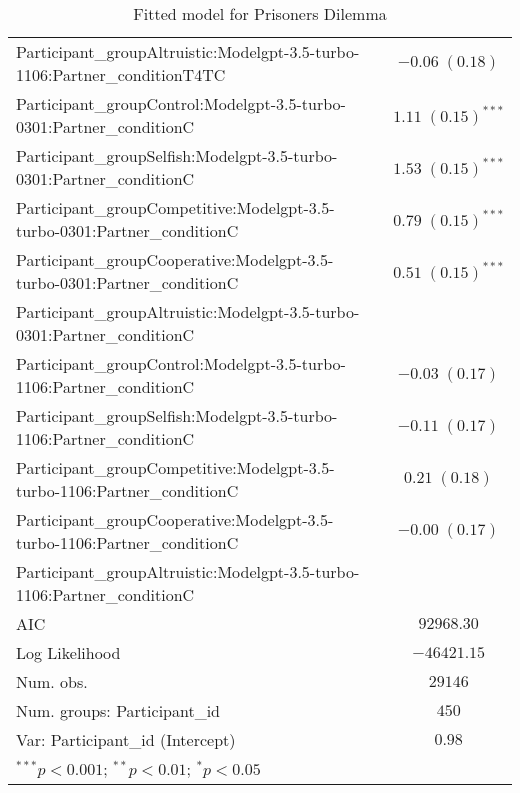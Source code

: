 \begin{table}
\begin{center}
\begin{small}
\begin{tabular}{l c}
Participant\_groupAltruistic:Modelgpt-3.5-turbo-1106:Partner\_conditionT4TC  & $-0.06 \; (0.18)$       \\
Participant\_groupControl:Modelgpt-3.5-turbo-0301:Partner\_conditionC        & $1.11 \; (0.15)^{***}$  \\
Participant\_groupSelfish:Modelgpt-3.5-turbo-0301:Partner\_conditionC        & $1.53 \; (0.15)^{***}$  \\
Participant\_groupCompetitive:Modelgpt-3.5-turbo-0301:Partner\_conditionC    & $0.79 \; (0.15)^{***}$  \\
Participant\_groupCooperative:Modelgpt-3.5-turbo-0301:Partner\_conditionC    & $0.51 \; (0.15)^{***}$  \\
Participant\_groupAltruistic:Modelgpt-3.5-turbo-0301:Partner\_conditionC     &                         \\
Participant\_groupControl:Modelgpt-3.5-turbo-1106:Partner\_conditionC        & $-0.03 \; (0.17)$       \\
Participant\_groupSelfish:Modelgpt-3.5-turbo-1106:Partner\_conditionC        & $-0.11 \; (0.17)$       \\
Participant\_groupCompetitive:Modelgpt-3.5-turbo-1106:Partner\_conditionC    & $0.21 \; (0.18)$        \\
Participant\_groupCooperative:Modelgpt-3.5-turbo-1106:Partner\_conditionC    & $-0.00 \; (0.17)$       \\
Participant\_groupAltruistic:Modelgpt-3.5-turbo-1106:Partner\_conditionC     &                         \\
\hline
AIC                                                                          & $92968.30$              \\
Log Likelihood                                                               & $-46421.15$             \\
Num. obs.                                                                    & $29146$                 \\
Num. groups: Participant\_id                                                 & $450$                   \\
Var: Participant\_id (Intercept)                                             & $0.98$                  \\
\hline
\multicolumn{2}{l}{\tiny{$^{***}p<0.001$; $^{**}p<0.01$; $^{*}p<0.05$}}
\end{tabular}
\end{small}
\caption{Fitted model for Prisoners Dilemma}
\label{table:pd-estimates}
\end{center}
\end{table}
